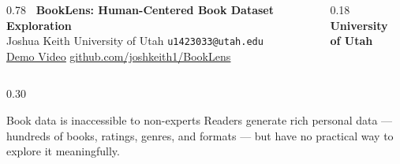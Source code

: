 \documentclass[final]{beamer}
\begin{document}
\begin{frame}[t]{}


\vspace{-1cm}
\begin{columns}[T]
  \begin{column}{0.78\linewidth}
    {\color{white}\fontsize{54}{60}\selectfont\bfseries
      \raisebox{0.15em}{\textcolor{gold}{$\blacksquare$}}~BookLens:
      Human-Centered Book Dataset Exploration}\\[0.5em]
    {\color{white}\Large Joshua Keith \quad University of Utah \quad
      \texttt{u1423033@utah.edu}}\\[0.6em]
    {\color{white}\LARGE
      \href{https://youtu.be/placeholder}{\underline{Demo Video}}
      \qquad\qquad
      \href{https://github.com/joshkeith1/BookLens}{\underline{github.com/joshkeith1/BookLens}}}
  \end{column}
  \begin{column}{0.18\linewidth}
    \raggedleft
    \color{white}\Large\bfseries University\\of Utah
  \end{column}
\end{columns}

\vspace{1.2cm}

\begin{columns}[T,totalwidth=\linewidth]

\begin{column}{0.30\linewidth}

  \begin{block}{Book data is inaccessible to non-experts}
    Readers generate rich personal data — hundreds of books, ratings, genres,
    and formats — but have no practical way to explore it meaningfully.


\end{block}
\end{column}
\end{columns}
\end{frame}
\end{document}
